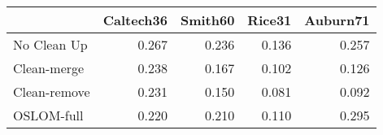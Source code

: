 \begin{tabular}{lrrrr}
\toprule
{} & Caltech36 & Smith60 & Rice31 & Auburn71 \\
\midrule
No Clean Up  &     0.267 &   0.236 &  0.136 &    0.257 \\
Clean-merge  &     0.238 &   0.167 &  0.102 &    0.126 \\
Clean-remove &     0.231 &   0.150 &  0.081 &    0.092 \\
OSLOM-full   &     0.220 &   0.210 &  0.110 &    0.295 \\
\bottomrule
\end{tabular}
